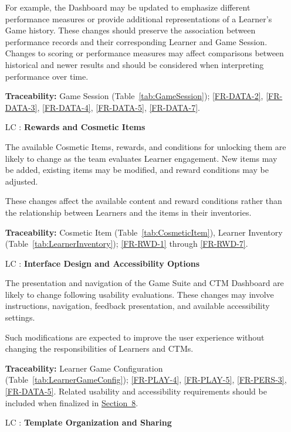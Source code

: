\documentclass[12pt]{article}
\newcounter{lcnum} %
\begin{document}
\begin{itemize}
For example, the Dashboard may be updated to emphasize different performance
measures or provide additional representations of a Learner's Game history.
These changes should preserve the association between performance records and
their corresponding Learner and Game Session. Changes to scoring or performance
measures may affect comparisons between historical and newer results and should
be considered when interpreting performance over time.

\textbf{Traceability:} Game Session (Table~\ref{tab:GameSession});
\ref{FR-DATA-2}, \ref{FR-DATA-3}, \ref{FR-DATA-4}, \ref{FR-DATA-5},
\ref{FR-DATA-7}.

\item[LC\refstepcounter{lcnum}\thelcnum
  \label{LC_Rewards}:] \textbf{Rewards and Cosmetic Items}

The available Cosmetic Items, rewards, and conditions for unlocking them are
likely to change as the team evaluates Learner engagement. New items may be
added, existing items may be modified, and reward conditions may be adjusted.

These changes affect the available content and reward conditions rather than the
relationship between Learners and the items in their inventories.

\textbf{Traceability:} Cosmetic Item (Table~\ref{tab:CosmeticItem}), Learner
Inventory (Table~\ref{tab:LearnerInventory}); \ref{FR-RWD-1} through
\ref{FR-RWD-7}.

\item[LC\refstepcounter{lcnum}\thelcnum
  \label{LC_InterfaceAccessibility}:] \textbf{Interface Design and Accessibility
Options}

The presentation and navigation of the Game Suite and CTM Dashboard are likely
to change following usability evaluations. These changes may involve
instructions, navigation, feedback presentation, and available accessibility
settings.

Such modifications are expected to improve the user experience without changing
the responsibilities of Learners and CTMs.

\textbf{Traceability:} Learner Game Configuration
(Table~\ref{tab:LearnerGameConfig}); \ref{FR-PLAY-4}, \ref{FR-PLAY-5},
\ref{FR-PERS-3}, \ref{FR-DATA-5}. Related usability and accessibility
requirements should be included when finalized in
\hyperlink{section.8}{Section~8}.

\item[LC\refstepcounter{lcnum}\thelcnum
  \label{LC_TemplateSharing}:] \textbf{Template Organization and Sharing}


\end{itemize}
\end{document}
